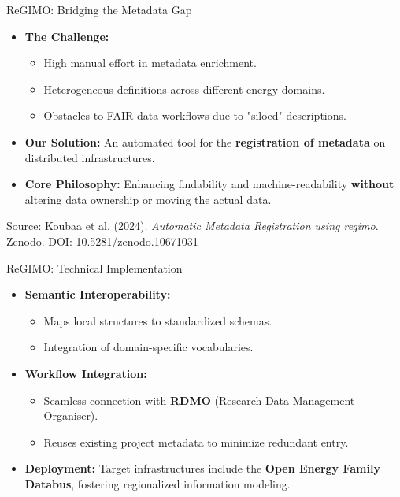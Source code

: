 \documentclass{beamer}
\begin{document}
\begin{frame}{ReGIMO: Bridging the Metadata Gap}
    \begin{itemize}
        \item \textbf{The Challenge:} 
            \begin{itemize}
                \item High manual effort in metadata enrichment.
                \item Heterogeneous definitions across different energy domains.
                \item Obstacles to FAIR data workflows due to "siloed" descriptions.
            \end{itemize}
        \item \textbf{Our Solution:} An automated tool for the \textbf{registration of metadata} on distributed infrastructures.
        \item \textbf{Core Philosophy:} Enhancing findability and machine-readability \textbf{without} altering data ownership or moving the actual data.
    \end{itemize}
    \vfill
    \tiny{Source: Koubaa et al. (2024). \textit{Automatic Metadata Registration using regimo}. Zenodo. DOI: 10.5281/zenodo.10671031}
\end{frame}

\begin{frame}{ReGIMO: Technical Implementation}
    \begin{itemize}
        \item \textbf{Semantic Interoperability:} 
            \begin{itemize}
                \item Maps local structures to standardized schemas.
                \item Integration of domain-specific vocabularies.
            \end{itemize}
        \item \textbf{Workflow Integration:}
            \begin{itemize}
                \item Seamless connection with \textbf{RDMO} (Research Data Management Organiser).
                \item Reuses existing project metadata to minimize redundant entry.
            \end{itemize}
        \item \textbf{Deployment:} Target infrastructures include the \textbf{Open Energy Family Databus}, fostering regionalized information modeling.
    \end{itemize}
\end{frame}
\end{document}
